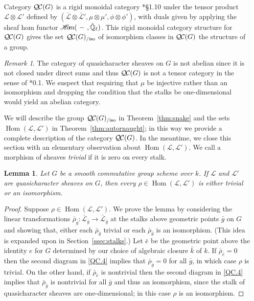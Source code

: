 \documentclass[10pt]{amsart}
\theoremstyle{plain}
\newtheorem{lemma}[theorem]{Lemma}
\theoremstyle{definition}
\theoremstyle{remark}
\newtheorem{remark}[theorem]{Remark}
\newcommand{\EE}{\mathbb{\bar Q}_\ell}
\newcommand{\bFq}{\bar{k}}
\newcommand{\Fq}{k}
\DeclareMathOperator{\Hom}{Hom}
\newcommand{\sheafHom}{{\mathscr{H}\hskip-4pt{\it o}\hskip-2pt{\it m}}}
\newcommand{\qcs}[1]{{\mathcal{#1}}}
\newcommand{\gqcs}[1]{{\mathcal{\bar #1}}}
\newcommand{\QC}{{\mathcal{Q\hskip-0.8pt C}}}
\newcommand{\QCiso}[1]{\QC(#1)_{/\text{iso}}}
\newcommand{\brho}{{\bar\rho}}
\begin{document}
Category $\QC(G)$ is a rigid monoidal category
\cite{etingof:09a}*{\S1.10} under the tensor product
$\qcs{L} \otimes \qcs{L'}$ defined by $(\gqcs{L}\otimes\gqcs{L'}, \mu\otimes\mu', \phi\otimes \phi')$,
with duals given by applying the sheaf hom functor
$\sheafHom(\ - \ ,\EE)$.
This rigid monoidal category structure for $\QC(G)$ gives the set $\QCiso{G}$
of isomorphism classes in $\QC(G)$ the structure of a group.

\begin{remark}
The category of quasicharacter sheaves on $G$ is not abelian since it is not closed under direct sums and thus $\QC(G)$
is not a tensor category in the sense of \cite{deligne:02a}*{0.1}.  We suspect that requiring that $\mu$ be injective rather than
an isomorphism and dropping the condition that the stalks be one-dimensional would yield an abelian category.
\end{remark}

We will describe the group $\QCiso{G}$ in Theorem~\ref{thm:snake}
and the sets $\Hom(\qcs{L},\qcs{L}')$ in Theorem~\ref{thm:autornaught}; in this way we provide a complete description of the category $\QC(G)$.
%
In the meantime, we close this section with an elementary observation about $\Hom(\qcs{L},\qcs{L}')$.
We call a morphism of sheaves \emph{trivial} if it is zero on every stalk.

\begin{lemma}\label{lem:autornaught}
Let $G$ be a smooth commutative group scheme over $\Fq$.
If $\qcs{L}$ and $\qcs{L}'$ are quasicharacter sheaves on $G$, then
every $\rho\in \Hom(\qcs{L},\qcs{L}')$ is either trivial or an isomorphism. 
\end{lemma}

\begin{proof}
Suppose $\rho \in \Hom(\qcs{L},\qcs{L}')$.
We prove the lemma by considering the linear transformations $\brho_{\bar g} : \gqcs{L}_{\bar g} \to \gqcs{L}_{\bar g}$ at the stalks above geometric points ${\bar g}$ on $G$ and showing that, either each $\brho_{\bar g}$ trivial or each $\brho_{\bar g}$ is an isomorphism.
(This idea is expanded upon in Section~\ref{ssec:stalks}.)
Let ${\bar e}$ be the geometric point above the identity $e$ for $G$ determined by our choice of algebraic closure $\bFq$ of $\Fq$.
If $\brho_{\bar e} = 0$ then the second diagram in \ref{QC.4} implies that $\brho_{\bar g} = 0$ for all ${\bar g}$, in which case $\rho$ is trivial.
On the other hand, if $\brho_{\bar e}$ is nontrivial then the second diagram in \ref{QC.4}  implies that $\brho_{\bar g}$ is nontrivial for all ${\bar g}$ and thus an isomorphism, since the stalk of quasicharacter sheaves are one-dimensional; in this case $\rho$ is an isomorphism.
\end{proof}
\end{document}
